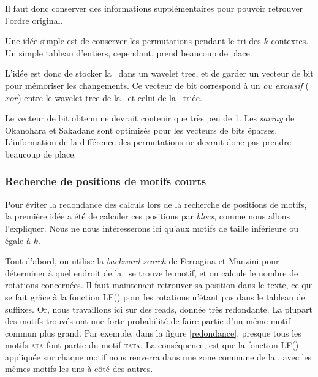Il faut donc conserver des informations supplémentaires pour pouvoir retrouver l'ordre original.

Une idée simple est de conserver les permutations pendant le tri des $k$-contextes. Un simple tableau d'entiers, cependant, prend beaucoup de place.

L'idée est donc de stocker la \kbwt\ dans un wavelet tree, et de garder un vecteur de bit pour mémoriser les changements. Ce vecteur de bit correspond à un \textit{ou exclusif} ($xor$) entre le wavelet tree de la \kbwt\ et celui de la \kbwt\ triée.

Le vecteur de bit obtenu ne devrait contenir que très peu de 1. Les \textit{sarray} de Okanohara et Sakadane sont optimisés pour les vecteurs de bits éparses. L'information de la différence des permutations ne devrait donc pas prendre beaucoup de place.



\subsubsection{Recherche de positions de motifs courts}
Pour éviter la redondance des calculs lors de la recherche de positions de motifs, la première idée a été de calculer ces positions par \textit{blocs}, comme nous allons l'expliquer. Nous ne nous intéresserons ici qu'aux motifs de taille inférieure ou égale à $k$. 

Tout d'abord, on utilise la \textit{backward search} de Ferragina et Manzini pour déterminer à quel endroit de la \kbwt\ se trouve le motif, et on calcule le nombre de rotations concernées. Il faut maintenant retrouver sa position dans le texte, ce qui se fait grâce à la fonction LF() pour les rotations n'étant pas dans le tableau de suffixes. Or, nous travaillons ici sur des reads, donnée très redondante. La plupart des motifs trouvés ont une forte probabilité de faire partie d'un même motif commun plus grand. Par exemple, dans la figure \ref{redondance}, presque tous les motifs \textsc{ata} font partie du motif \textsc{tata}. La conséquence, est que la fonction LF() appliquée sur chaque motif nous renverra dans une zone commune de la \kbwt, avec les mêmes motifs les uns à côté des autres.

